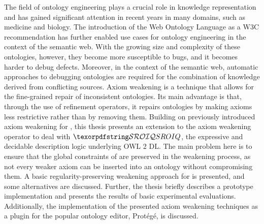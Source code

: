 The field of ontology engineering plays a crucial role in knowledge representation and has gained significant attention in recent years in many domains, such as medicine and biology. The introduction of the Web Ontology Language as a W3C recommendation has further enabled use cases for ontology engineering in the context of the semantic web. With the growing size and complexity of these ontologies, however, they become more susceptible to bugs, and it becomes harder to debug defects. Moreover, in the context of the semantic web, automatic approaches to debugging ontologies are required for the combination of knowledge derived from conflicting sources. Axiom weakening is a technique that allows for the fine-grained repair of inconsistent ontologies. Its main advantage is that, through the use of refinement operators, it repairs ontologies by making axioms less restrictive rather than by removing them. Building on previously introduced axiom weakening for \ALC, this thesis presents an extension to the axiom weakening operator to deal with $\SROIQ$, the expressive and decidable description logic underlying OWL 2 DL. The main problem here is to ensure that the global constraints of \SROIQ are preserved in the weakening process, as not every weaker axiom can be inserted into an ontology without compromising them. A basic regularity-preserving weakening approach for \SROIQ is presented, and some alternatives are discussed. Further, the thesis briefly describes a prototype implementation and presents the results of basic experimental evaluations. Additionally, the implementation of the presented axiom weakening techniques as a plugin for the popular ontology editor, Protégé, is discussed.
